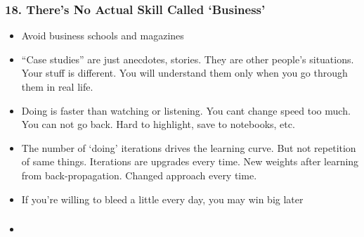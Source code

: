 \begin{frame}[fragile]
\frametitle{18. There’s No Actual Skill Called `Business'}
\begin{itemize}
\item Avoid business schools and magazines
\item ``Case studies'' are just anecdotes, stories. They are other people's situations. Your stuff is different. You will understand them only when you go through them in real life.
\item Doing is faster than watching or listening. You cant change speed too much. You can not go back. Hard to highlight, save to notebooks, etc.
\item The number of `doing' iterations drives the learning curve. But not repetition of same things. Iterations are upgrades every time. New weights after learning from back-propagation. Changed approach every time.
\item If you're willing to bleed a little every day, you may win big later
\end{itemize}
\end{frame}


\begin{frame}[fragile]
\frametitle{}
\begin{itemize}
\item 
\end{itemize}
\end{frame}
